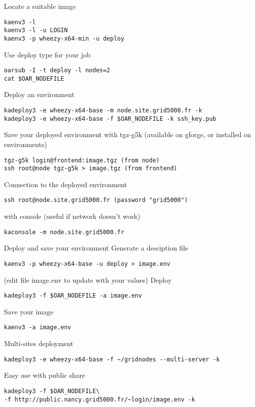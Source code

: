 Locate a suitable image
\begin{lstlisting}
kaenv3 -l
kaenv3 -l -u LOGIN
kaenv3 -p wheezy-x64-min -u deploy
\end{lstlisting}

Use deploy type for your job
\begin{lstlisting}
oarsub -I -t deploy -l nodes=2
cat $OAR_NODEFILE
\end{lstlisting}

Deploy an environment
\begin{lstlisting}
kadeploy3 -e wheezy-x64-base -m node.site.grid5000.fr -k
kadeploy3 -e wheezy-x64-base -f $OAR_NODEFILE -k ssh_key.pub
\end{lstlisting}

Save your deployed environment with tgz-g5k
(available on gforge, or installed on environments)
\begin{lstlisting}
tgz-g5k login@frontend:image.tgz (from node)
ssh root@node tgz-g5k > image.tgz (from frontend)
\end{lstlisting}

Connection to the deployed environment
\begin{lstlisting}
ssh root@node.site.grid5000.fr (password "grid5000")
\end{lstlisting}
with console (useful if network doesn't work)
\begin{lstlisting}
kaconsole -m node.site.grid5000.fr
\end{lstlisting}

Deploy and save your environment
Generate a desciption file
\begin{lstlisting}
kaenv3 -p wheezy-x64-base -u deploy > image.env
\end{lstlisting}
(edit file image.env to update with your values)
Deploy
\begin{lstlisting}
kadeploy3 -f $OAR_NODEFILE -a image.env
\end{lstlisting}
Save your image
\begin{lstlisting}
kaenv3 -a image.env
\end{lstlisting}

Multi-sites deployment
\begin{lstlisting}
kadeploy3 -e wheezy-x64-base -f ~/gridnodes --multi-server -k
\end{lstlisting}
Easy use with public share
\begin{lstlisting}
kadeploy3 -f $OAR_NODEFILE\
-f http://public.nancy.grid5000.fr/~login/image.env -k
\end{lstlisting}